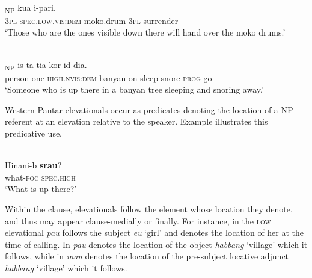 \documentclass[output=paper]{LSP/langsci}
\begin{document}
\ea%
\label{ex:7:30}
 \\
\textsubscript{NP} kua{\ng}  i-pari{\ng}.\\
    \textsc{3pl} \textsc{spec.low.vis:dem} moko.drum  \textsc{3pl-}surrender\\
\glt `Those who are the ones visible down there will hand over the moko drums.'
\z



 
  



\ea%
\label{ex:7:31}
 \\
\textsubscript{NP} is   ta{\ng} ti{\textglotstop}a{\ng} kor  id-dia.\\
    person  one  \textsc{high.}\textsc{nvis:dem} banyan  on  sleep  snore  \textsc{prog}{}-go\\
\glt `Someone who is up there in a banyan tree sleeping and snoring away.'
\z

  
 

  

Western Pantar elevationals occur as predicates denoting the location of a NP referent at an elevation relative to the speaker. Example  illustrates this predicative use. 

 

\ea%
\label{ex:7:32}
 \\
\gll  Hinani-b  \textbf{{srau}}{?} \\
   what-\textsc{foc} \textsc {spec.high}  \\
\glt `What is up there?'  
\z

 

 

  

Within the clause, elevationals follow the element whose location they denote, and thus may appear clause-medially or finally. For instance, in  the \textsc{low} elevational \textit{pau} follows the subject \textit{eu} `girl' and denotes the location of her at the time of calling. In  \textit{pau} denotes the location of the object \textit{habbang} `village' which it follows, while in  \textit{mau} denotes the location of the pre-subject locative adjunct \textit{habbang} `village' which it follows.

 
\end{document}
